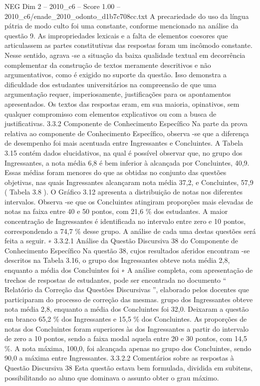 \begin{textsample}{NEG Dim 2 – 2010\_c6 – Score 1.00 – 2010\_c6/enade\_2010\_odonto\_d1b7c708cc.txt}
A precariedade do uso da língua pátria de modo culto foi uma constante, conforme mencionado na análise da questão 9.
As impropriedades lexicais e a falta de elementos coesores que articulassem as partes constitutivas das respostas foram um incômodo constante.
Nesse sentido, agrava -se a situação da baixa qualidade textual em decorrência complementar da construção de textos meramente descritivos e não argumentativos, como é exigido no suporte da questão.
Isso demonstra a dificuldade dos estudantes universitários na compreensão de que uma argumentação requer, imperiosamente, justificações para os apontamentos apresentados.
Os textos das respostas eram, em sua maioria, opinativos, sem qualquer compromisso com elementos explicativos ou com a busca de justificativas. 3.3.2 Componente de Conhecimento Específico Na parte da prova relativa ao componente de Conhecimento Específico, observa -se que a diferença de desempenho foi mais acentuada entre Ingressantes e Concluintes.
A Tabela 3.15 contém dados elucidativos, na qual é possível observar que, no grupo dos Ingressantes, a nota média 6,8 é bem inferior à alcançada por Concluintes, 40,9.
Essas médias foram menores do que as obtidas no conjunto das questões objetivas, nas quais Ingressantes alcançaram nota média 37,2, e Concluintes, 57,9 ( Tabela 3.8 ).
O Gráfico 3.12 apresenta a distribuição de notas nos diferentes intervalos.
Observa -se que os Concluintes atingiram proporções mais elevadas de notas na faixa entre 40 e 50 pontos, com 21,6 \% dos estudantes.
A maior concentração de Ingressantes é identificada no intervalo entre zero e 10 pontos, correspondendo a 74,7 \% desse grupo.
A análise de cada uma destas questões será feita a seguir. ∗ 3.3.2.1 Análise da Questão Discursiva 38 do Componente de Conhecimento Específico Na questão 38, cujos resultados aferidos encontram -se descritos na Tabela 3.16, o grupo dos Ingressantes obteve nota média 2,8, enquanto a média dos Concluintes foi ∗ A análise completa, com apresentação de trechos de respostas de estudantes, pode ser encontrada no documento “ Relatório da Correção das Questões Discursivas ”, elaborado pelos docentes que participaram do processo de correção das mesmas. grupo dos Ingressantes obteve nota média 2,8, enquanto a média dos Concluintes foi 32,0.
Deixaram a questão em branco 65,2 \% dos Ingressantes e 15,5 \% dos Concluintes.
As proporções de notas dos Concluintes foram superiores às dos Ingressantes a partir do intervalo de zero a 10 pontos, sendo a faixa modal aquela entre 20 e 30 pontos, com 14,5 \%.
A nota máxima, 100,0, foi alcançada apenas no grupo dos Concluintes, sendo 90,0 a máxima entre Ingressantes. 3.3.2.2 Comentários sobre as respostas à Questão Discursiva 38 Esta questão estava bem formulada, dividida em subitens, possibilitando ao aluno que dominava o assunto obter o grau máximo.

\end{textsample}
